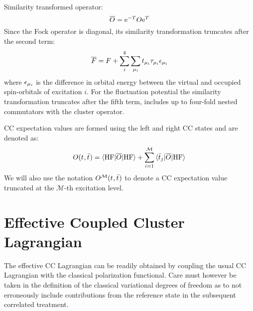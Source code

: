 Similarity transformed operator:
\begin{equation}
  \overline{O} =\mathrm{e}^{-T}O\mathrm{e}^{T}
\end{equation}
Since the Fock operator is diagonal, its similarity transformation
truncates after the second term:
\begin{equation}
  \overline{F} = F + \sum_{i}^4\sum_{\mu_i}t_{\mu_i}\tau_{\mu_i}\epsilon_{\mu_i}
\end{equation}
where $\epsilon_{\mu_i}$ is the difference in orbital energy between the
virtual and occupied spin-orbitals of excitation $i$.
For the fluctuation potential the similarity transformation truncates
after the fifth term, \ie{} includes up to four-fold nested commutators
with the cluster operator.

\acs{CC} expectation values are formed using the left and
right \acs{CC} states and are denoted as:
\begin{equation}
  O(t_{}, \bar{t}_{}) = \braket{\mathrm{HF} | \overline{O} | \mathrm{HF} }
  + \sum_{i=1}^{\mathcal{M}}\braket{\bar{t}_{j} | \overline{O} | \mathrm{HF} }
\end{equation}
We will also use the notation $O^\mathcal{M}(t_{}, \bar{t}_{})$ to
denote a \acs{CC} expectation value truncated at the $\mathcal{M}$-th
excitation level.

\section{Effective Coupled Cluster Lagrangian}

The effective CC Lagrangian can be readily obtained by coupling the
usual CC Lagrangian with the classical polarization functional.
Care must however be taken in the definition of the classical
variational degrees of freedom as to not erroneously include
contributions from the reference state in the subsequent correlated
treatment.

